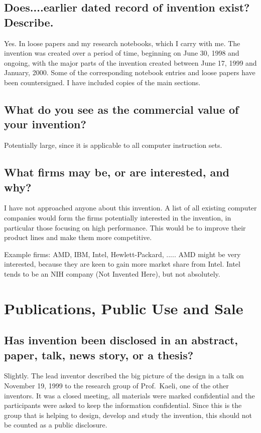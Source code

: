 \documentclass[10pt,dvips]{article}
\begin{document}
\subsection{Does....earlier dated record of invention exist? Describe.}
Yes. In loose papers and my research notebooks, which I carry with me.
The invention was created
over a period of time, beginning on June 30, 1998 and ongoing, with the major
parts of
the invention created between June 17, 1999 and January, 2000. Some of
the corresponding
notebook entries and loose papers have been countersigned. I have included
copies of the main sections.

\subsection{What do you see as the commercial value of your invention?}
Potentially large, since it is applicable to all computer instruction sets.

\subsection{What firms may be, or are interested, and why?}
I have not approached anyone about this invention. A list of all
existing computer
companies would form the firms potentially interested in the invention,
in particular those
focusing on high performance. This would be to improve their product lines
and make them more competitive.

Example firms: AMD, IBM, Intel, Hewlett-Packard, ..... AMD
might be very interested,
because they are keen to gain more market share from Intel. Intel tends to be
an NIH company (Not Invented Here), but not absolutely.

\newpage

\section{Publications, Public Use and Sale}
\subsection{Has invention been disclosed in an abstract, paper, talk, news story, or
a thesis?}
Slightly. The lead inventor
described the big picture of the design in a talk on November 19, 1999
to the research group of Prof.\ Kaeli, one of the other inventors. It was a closed
meeting, all materials were marked confidential and the participants were asked
to keep the information confidential. Since this is the group that is helping
to design, develop and study the invention, this should not be counted as
a public disclosure.
\end{document}
